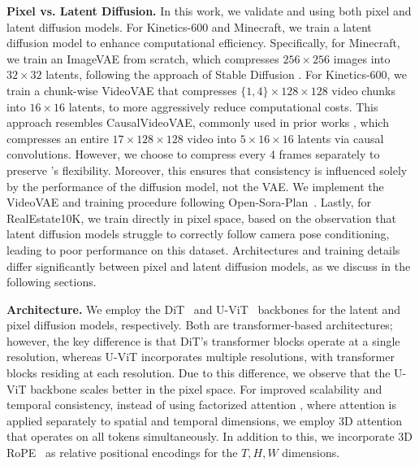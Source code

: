 \textbf{Pixel vs. Latent Diffusion.} In this work, we validate \mtd and \HG using both pixel and latent diffusion models. For Kinetics-600 and Minecraft, we train a latent diffusion model to enhance computational efficiency. Specifically, for Minecraft, we train an ImageVAE \cite{kingma2013auto} from scratch, which compresses $256 \times 256$ images into $32 \times 32$ latents, following the approach of Stable Diffusion \cite{rombach2022high}. For Kinetics-600, we train a chunk-wise VideoVAE that compresses $\{1, 4\} \times 128 \times 128$ video chunks into $16 \times 16$ latents, to more aggressively reduce computational costs. This approach resembles CausalVideoVAE, commonly used in prior works \cite{yu2023language,gupta2023photorealistic}, which compresses an entire $17 \times 128 \times 128$ video into $5 \times 16 \times 16$ latents via causal convolutions. However, we choose to compress every 4 frames separately to preserve \mtd's flexibility. Moreover, this ensures that consistency is influenced solely by the performance of the diffusion model, not the VAE. We implement the VideoVAE and training procedure following Open-Sora-Plan~\cite{lin2024open}. Lastly, for RealEstate10K, we train directly in pixel space, based on the observation that latent diffusion models struggle to correctly follow camera pose conditioning, leading to poor performance on this dataset. Architectures and training details differ significantly between pixel and latent diffusion models, as we discuss in the following sections.

\textbf{Architecture.} We employ the DiT~\cite{peebles2023scalable} and U-ViT~\cite{hoogeboom2023simple, hoogeboom2024simpler} backbones for the latent and pixel diffusion models, respectively. Both are transformer-based architectures; however, the key difference is that DiT's transformer blocks operate at a single resolution, whereas U-ViT incorporates multiple resolutions, with transformer blocks residing at each resolution. Due to this difference, we observe that the U-ViT backbone scales better in the pixel space. For improved scalability and temporal consistency, instead of using factorized attention \cite{ho2022video}, where attention is applied separately to spatial and temporal dimensions, we employ 3D attention that operates on all tokens simultaneously. In addition to this, we incorporate 3D RoPE~\cite{su2023roformer,gervet2023act3d} as relative positional encodings for the $T, H, W$ dimensions.

